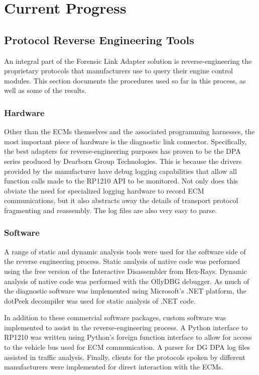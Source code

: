 \documentclass{report}
\begin{document}
\chapter{Current Progress}

\section{Protocol Reverse Engineering Tools}

An integral part of the Forensic Link Adapter solution is reverse-engineering the proprietary protocols that manufacturers use to query their engine control modules.
This section documents the procedures used so far in this process, as well as some of the results.

\subsection{Hardware}

Other than the ECMs themselves and the associated programming harnesses, the most important piece of hardware is the diagnostic link connector. Specifically, the
best adapters for reverse-engineering purposes has proven to be the DPA series produced by Dearborn Group Technologies. This is because the drivers provided by the
manufacturer have debug logging capabilities that allow all function calls made to the RP1210 API to be monitored. Not only does this obviate the need for specialized
logging hardware to record ECM communications, but it also abstracts away the details of transport protocol fragmenting and reassembly. The log files are also very
easy to parse.

\subsection{Software}

A range of static and dynamic analysis tools were used for the software side of the reverse engineering process. Static analysis of native code was performed using
the free version of the Interactive Disassembler from Hex-Rays. Dynamic analysis of native code was performed with the OllyDBG debugger. As much of the diagnostic
software was implemented using Microsoft's .NET platform, the dotPeek decompiler was used for static analysis of .NET code.

In addition to these commercial software packages, custom software was implemented to assist in the reverse-engineering process. A Python interface to RP1210 was written
using Python's foreign function interface to allow for access to the vehicle bus used for ECM communication. A parser for DG DPA log files assisted in traffic analysis.
Finally, clients for the protocols spoken by different manufacturers were implemented for direct interaction with the ECMs.
\end{document}
